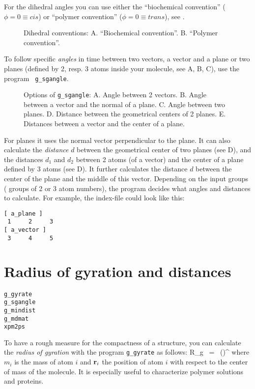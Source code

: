 For the dihedral angles you can use either the ``biochemical convention'' 
($\phi = 0 \equiv cis$) or ``polymer convention'' ($\phi = 0 \equiv trans$), 
see .

\begin{figure}
\centerline{
{}}
\caption[Dihedral conventions.]{Dihedral conventions: A. ``Biochemical
convention''. B. ``Polymer convention''.}
\label{fig:dih_def}
\end{figure}

To follow specific {\em angles} in time between two vectors, a vector
and a plane or two planes (defined by 2, resp. 3 atoms inside your
molecule, see A, B, C), use the program {\tt
g\_sgangle}.

\begin{figure}
\centerline{
{}}
\caption[Options of {\tt g\_sgangle}.]{Options of {\tt g\_sgangle}: A. Angle between 2 vectors. B. Angle between a vector and the normal of a plane. C. Angle between two planes. D. Distance between the geometrical centers of 2 planes. E. Distances between a vector and the center of a plane.}
\label{fig:sgangle}
\end{figure}

For planes it uses the normal vector perpendicular to the plane.  It
can also calculate the {\em distance} $d$ between the geometrical
center of two planes (see D), and the distances
$d_1$ and $d_2$ between 2 atoms (of a vector) and the center of a
plane defined by 3 atoms (see D). It further
calculates the distance $d$ between the center of the plane and the
middle of this vector.  Depending on the input groups ({\ie} groups of
2 or 3 atom numbers), the program decides what angles and distances to
calculate. For example, the index-file could look like this:
{\samepage
\begin{verbatim}
[ a_plane ]
 1     2     3
[ a_vector ]
 3     4     5
\end{verbatim}}


\section{Radius of gyration and distances}
\label{sec:rg}
\begin{verbatim}
g_gyrate
g_sgangle
g_mindist
g_mdmat
xpm2ps
\end{verbatim}
To have a rough measure for the compactness of a structure, you can calculate 
the {\em radius of gyration} with the program {\tt g\_gyrate} as follows:
\beq
R_g ~=~ \left({}\right)^{\half}
\label{eqn:rg}
\eeq
where $m_i$ is the mass of atom $i$ and ${\bf r}_i$ the position of 
atom $i$ with respect to the center of mass of the molecule. It is especially 
useful to characterize polymer solutions and proteins.

